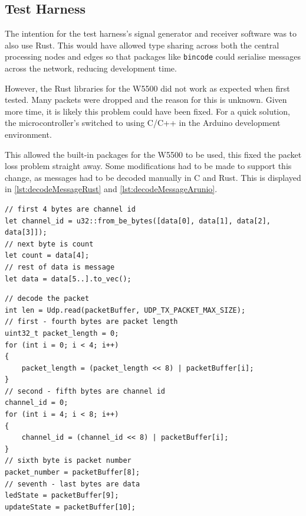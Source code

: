 \clearpage

\subsection{Test Harness}

The intention for the test harness's signal generator and receiver software was to also use Rust. This would have allowed type sharing across both the central processing nodes and edges so that packages like \verb|bincode| could serialise messages across the network, reducing development time.

However, the Rust libraries for the W5500 did not work as expected when first tested. Many packets were dropped and the reason for this is unknown. Given more time, it is likely this problem could have been fixed. For a quick solution, the microcontroller's switched to using C/C++ in the Arduino development environment.

This allowed the built-in packages for the W5500 to be used, this fixed the packet loss problem straight away. Some modifications had to be made to support this change, as messages had to be decoded manually in C and Rust. This is displayed in \autoref{lst:decodeMessageRust} and \autoref{lst:decodeMessageArunio}.

\hfill

\begin{lstlisting}[caption=Decode message (Rust), label={lst:decodeMessageRust},captionpos=b]
// first 4 bytes are channel id
let channel_id = u32::from_be_bytes([data[0], data[1], data[2], data[3]]);
// next byte is count
let count = data[4];
// rest of data is message
let data = data[5..].to_vec();
\end{lstlisting}

\begin{lstlisting}[caption=Decode message (Arduino), label={lst:decodeMessageArunio},captionpos=b]
// decode the packet
int len = Udp.read(packetBuffer, UDP_TX_PACKET_MAX_SIZE);
// first - fourth bytes are packet length
uint32_t packet_length = 0;
for (int i = 0; i < 4; i++)
{
    packet_length = (packet_length << 8) | packetBuffer[i];
}
// second - fifth bytes are channel id
channel_id = 0;
for (int i = 4; i < 8; i++)
{
    channel_id = (channel_id << 8) | packetBuffer[i];
}
// sixth byte is packet number
packet_number = packetBuffer[8];
// seventh - last bytes are data
ledState = packetBuffer[9];
updateState = packetBuffer[10];
\end{lstlisting}



